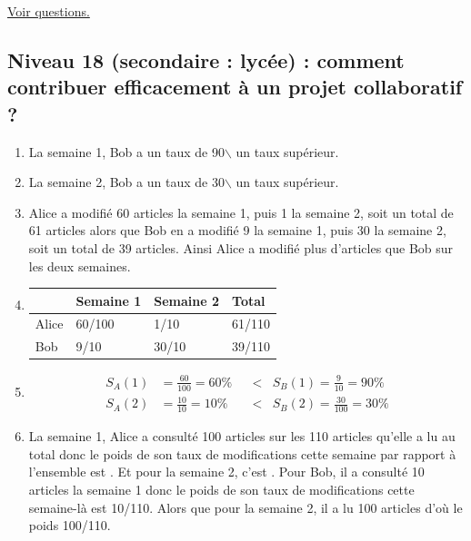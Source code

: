 \documentclass[11pt]{article}
\begin{document}
\hyperref[org5141823]{Voir questions.}


\newpage


\subsection{Niveau 18 (secondaire : lycée) : comment contribuer efficacement à un projet collaboratif ?}
\label{sec:org8e2dd6c}

\label{org6a03837}


\begin{enumerate}
\item La semaine 1, Bob a un taux de 90$\backslash$%
un taux supérieur.
\item La semaine 2, Bob a un taux de 30$\backslash$%
un taux supérieur.
\item Alice a modifié 60 articles la semaine 1, puis 1 la semaine 2, soit
un total de 61 articles alors que Bob en a modifié 9 la semaine 1,
puis 30 la semaine 2, soit un total de 39 articles. Ainsi Alice a
modifié plus d'articles que Bob sur les deux semaines.
\item \label{orgb03410c}
\begin{center}
\begin{tabular}{llll}
 & Semaine 1 & Semaine 2 & Total\\[0pt]
\hline
Alice & 60/100 & 1/10 & 61/110\\[0pt]
Bob & 9/10 & 30/10 & 39/110\\[0pt]
\end{tabular}
\end{center}

\item \begin{align*}
     S_A(1) &= \frac{60}{100} = 60\% &&<& S_B(1) = \frac{9}{10} = 90\% \\
     S_A(2) &= \frac{10}{10} = 10\% &&<& S_B(2) = \frac{30}{100} = 30\% 
 \end{align*}
\item La semaine 1, Alice a consulté 100 articles sur les 110 articles
qu'elle a lu au total donc le poids de son taux de modifications
cette semaine par rapport à l'ensemble est .
Et pour la semaine 2, c'est .
Pour Bob, il a consulté 10 articles la semaine 1 donc le poids
de son taux de modifications cette semaine-là est
10/110.
Alors que pour la semaine 2, il a lu 100 articles d'où le
poids 100/110.
\end{enumerate}
\end{document}

